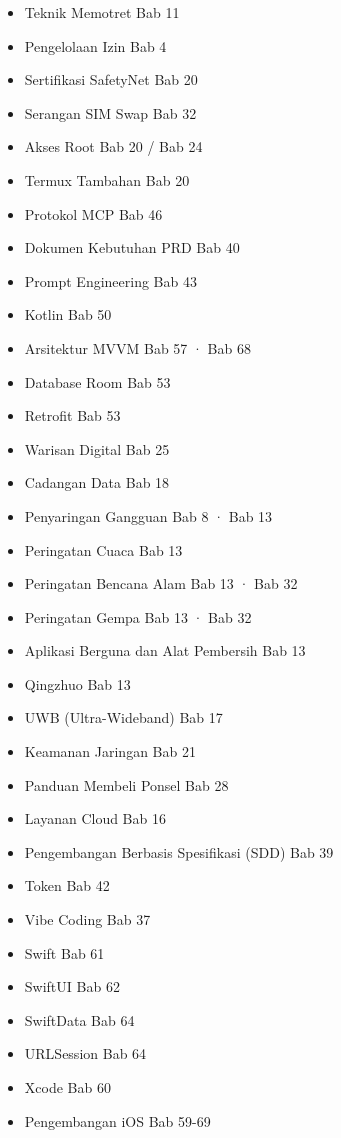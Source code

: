 
\begin{itemize}
  \item Teknik Memotret Bab 11
  \item Pengelolaan Izin Bab 4
  \item Sertifikasi SafetyNet Bab 20
  \item Serangan SIM Swap Bab 32
  \item Akses Root Bab 20 / Bab 24
  \item Termux Tambahan Bab 20
  \item Protokol MCP Bab 46
  \item Dokumen Kebutuhan PRD Bab 40
  \item Prompt Engineering Bab 43
  \item Kotlin Bab 50
  \item Arsitektur MVVM Bab 57 · Bab 68
  \item Database Room Bab 53
  \item Retrofit Bab 53
\end{itemize}


\begin{itemize}
  \item Warisan Digital Bab 25
  \item Cadangan Data Bab 18
  \item Penyaringan Gangguan Bab 8 · Bab 13
  \item Peringatan Cuaca Bab 13
  \item Peringatan Bencana Alam Bab 13 · Bab 32
  \item Peringatan Gempa Bab 13 · Bab 32
  \item Aplikasi Berguna dan Alat Pembersih Bab 13
  \item Qingzhuo Bab 13
  \item UWB (Ultra-Wideband) Bab 17
  \item Keamanan Jaringan Bab 21
  \item Panduan Membeli Ponsel Bab 28
  \item Layanan Cloud Bab 16
  \item Pengembangan Berbasis Spesifikasi (SDD) Bab 39
  \item Token Bab 42
  \item Vibe Coding Bab 37
  \item Swift Bab 61
  \item SwiftUI Bab 62
  \item SwiftData Bab 64
  \item URLSession Bab 64
  \item Xcode Bab 60
  \item Pengembangan iOS Bab 59-69
\end{itemize}

